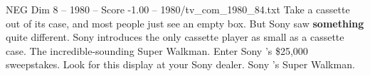 \begin{textsample}{NEG Dim 8 – 1980 – Score -1.00 – 1980/tv\_com\_1980\_84.txt}  \label{ex:f8_neg_054}
Take a cassette out of its case, and most people just see an empty box.
But Sony saw \textbf{something} quite different.
Sony introduces the only cassette player as small as a cassette case.
The incredible-sounding Super Walkman.
Enter Sony 's \$25,000 sweepstakes.
Look for this display at your Sony dealer.
Sony 's Super Walkman.

\end{textsample}
